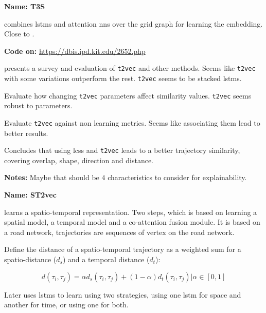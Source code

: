 
\textbf{Name: T3S}

\cite{yang2021t3s} combines \glspl{lstm} and attention \glspl{nn} over the grid graph for learning the embedding. Close to \cite{yao2019computing, zhang2020trajectory, chen2021embedding}.


\textbf{Code on:} \url{https://dbis.ipd.kit.edu/2652.php}

\cite{taghizadeh2021meaningful} presents a survey and evaluation of \texttt{t2vec} \cite{li2018deep} and other methods. Seems like \texttt{t2vec} with some variations outperform the rest. \texttt{t2vec} seems to be stacked \glspl{lstm}.

Evaluate how changing \texttt{t2vec} parameters affect similarity values. \texttt{t2vec} seems robust to parameters.

Evaluate \texttt{t2vec} against non learning metrics. Seems like associating them lead to better results.


Concludes that using \gls{lcss} and \texttt{t2vec} leads to a better trajectory similarity, covering overlap, shape, direction and distance.

\textbf{Notes:} Maybe that should be $4$ characteristics to consider for explainability.   



\textbf{Name: ST2vec}

\cite{fang2022spatio} learns a spatio-temporal representation. Two steps, which is based on learning a spatial model, a temporal model and a co-attention fusion module. It is based on a road network, trajectories are sequences of vertex on the road network.

Define the distance of a spatio-temporal trajectory as a weighted sum for a spatio-distance ($d_s$) and a temporal distance ($d_t$):

$$d(\tau_i, \tau_j) = \alpha d_s(\tau_i, \tau_j) + (1-\alpha)d_t(\tau_i, \tau_j) | \alpha \in [0,1]$$

Later uses \glspl{lstm} to learn using two strategies, using one \gls{lstm} for space and another for time, or using one for both.

